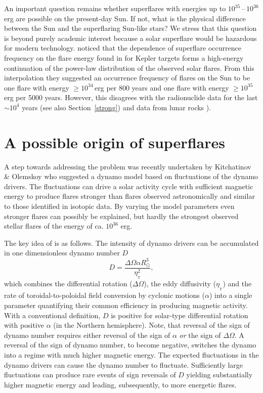\documentclass[fleqn,12pt]{SelfArx} %
\begin{document}
An important question remains whether superflares with energies up to $10^{35}$\,--\,$10^{36}$ erg are possible 
on the present-day Sun. If not, what is the physical difference between the Sun and the superflaring Sun-like 
stars? We stress that this question is beyond purely academic interest because a solar superflare would be 
hazardous for modern technology.
\cite{9} noticed that the dependence of superflare occurrence frequency on the flare energy found in \cite{3} for Kepler 
targets forms a high-energy continuation of the power-law distribution of the observed solar flares. From this 
interpolation they suggested an occurrence frequency of flares on the Sun to be one flare with energy 
$\geq10^{34}$\,erg per 800 years and one flare with energy $\geq10^{35}$\,erg per 5000 years.
However, this disagrees with the radionuclide data for the last $\sim 10^4$ years \cite{10,11} 
(see also  Section~\ref{strong}) and data from lunar rocks \cite{12}).



\section{A possible origin of superflares}

A step towards addressing the problem was recently undertaken by Kitchatinov \& Olemskoy \cite{1} who suggested a 
dynamo model based on fluctuations of the dynamo drivers. The fluctuations can drive a solar activity cycle with 
sufficient magnetic energy to produce flares stronger than flares observed astronomically and similar to those 
identified in isotopic data. By varying the model parameters even stronger flares can possibly  be explained, but 
hardly the strongest observed stellar flares of the energy of ca. $10^{36}$ erg.

The key idea of \cite{1} is as follows. The intensity of dynamo drivers can be accumulated 
in one dimensionless dynamo number $D$
\begin{equation}
    D = \frac{\Delta\Omega\alpha R^3_\odot}{\eta^2_{_\mathrm{T}}},
    \label{1}
\end{equation}
which combines the differential rotation ($\Delta\Omega$), the eddy diffusivity ($\eta_{_\mathrm{T}}$) and the 
rate of toroidal-to-poloidal field conversion by cyclonic motions ($\alpha$) into a single parameter quantifying 
their common efficiency in producing magnetic activity. With a conventional definition, $D$ is positive for 
solar-type differential rotation with positive $\alpha$ (in the Northern hemisphere). 
Note, that reversal of the sign of dynamo number requires either reversal of the sign of $\alpha$ {\it or} the 
sign of $\Delta \Omega$.
A reversal of the sign of dynamo number, to become negative, switches the dynamo into a regime with much higher 
magnetic energy. The expected fluctuations in the dynamo drivers can cause the dynamo number to fluctuate. 
Sufficiently large fluctuations can produce rare events of sign reversals of $D$ yielding substantially higher 
magnetic energy and leading, subsequently, to more energetic flares.
\end{document}
